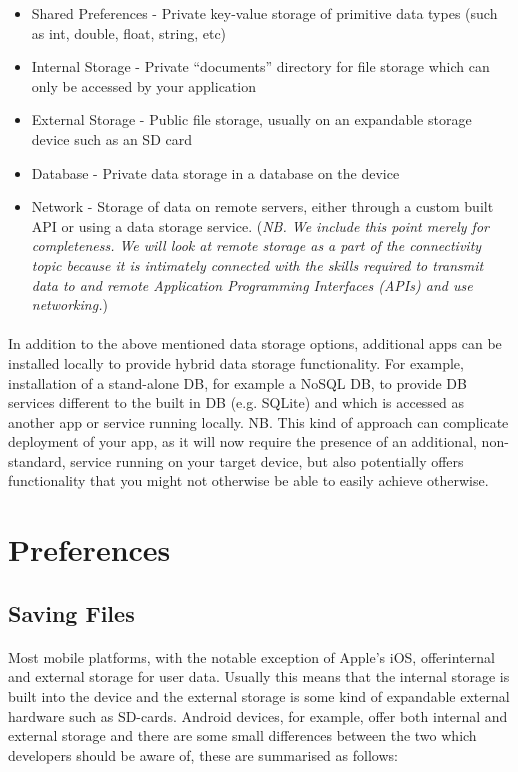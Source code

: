 \begin{itemize}
\item Shared Preferences - Private key-value storage of primitive data types (such as int, double, float, string, etc)
\item Internal Storage - Private ``documents'' directory for file storage which can only be accessed by your application
\item External Storage - Public file storage, usually on an expandable storage device such as an SD card
\item Database - Private data storage in a database on the device
\item Network - Storage of data on remote servers, either through a custom built API or using a data storage service. ({\emph{NB. We include this point merely for completeness. We will look at remote storage as a part of the connectivity topic because it is intimately connected with the skills required to transmit data to and remote Application Programming Interfaces (APIs) and use networking.}})
\end{itemize}

\paragraph{} In addition to the above mentioned data storage options, additional apps can be installed locally to provide hybrid data storage functionality. For example, installation of a stand-alone DB, for example a NoSQL DB, to provide DB services different to the built in DB (e.g. SQLite) and which is accessed as another app or service running locally. NB. This kind of approach can complicate deployment of your app, as it will now require the presence of an additional, non-standard, service running on your target device, but also potentially offers functionality that you might not otherwise be able to easily achieve otherwise.


\section{Preferences}
\paragraph{}

\subsection{Saving Files}
\paragraph{} Most mobile platforms, with the notable exception of Apple's iOS, offerinternal and external storage for user data. Usually this means that the internal storage is built into the device and the external storage is some kind of expandable external hardware such as SD-cards. Android devices, for example, offer both internal and external storage and there are some small differences between the two which developers should be aware of, these are summarised as follows:

